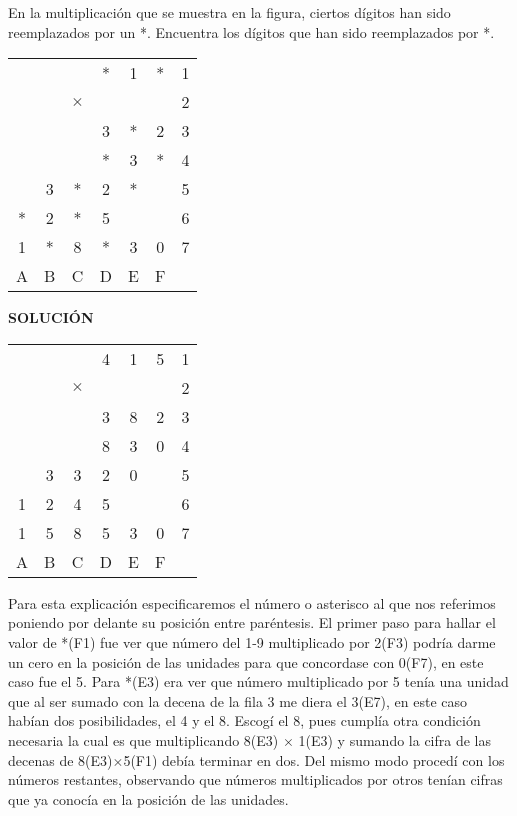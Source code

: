 \begin{excercise}
    En la multiplicación que se muestra en la figura, ciertos dígitos han sido reemplazados por un *.
    Encuentra los dígitos que han sido reemplazados por *.
\end{excercise}

\begin{figure*}
    \centering
    \begin{tabular}{c c c c c c | c}
        &&&*&1&*&  1 \\
        &&$\times$&&&&  2 \\
        &&&3&*&2&  3 \\
        \hline
        &&&*&3&*&  4\\
        &3&*&2&*&&  5 \\
        *&2&*&5&&&  6\\
        \hline
        1&*&8&*&3&0&  7\\
        A&B&C&D&E&F \\
    \end{tabular}    
\end{figure*}


\textbf{SOLUCIÓN}

    \begin{center}    
        \begin{tabular}{c c c c c c | c}
            &&&4&1&5&  1 \\
            &&$\times$&&&&  2 \\
            &&&3&8&2&  3 \\
            \hline
            &&&8&3&0&  4\\
            &3&3&2&0&&  5 \\
            1&2&4&5&&&  6\\
            \hline
            1&5&8&5&3&0&  7\\
            A&B&C&D&E&F \\
        \end{tabular}
    \end{center}

Para esta explicación especificaremos el número o asterisco al que nos referimos poniendo por delante su posición entre paréntesis.
El primer paso para hallar el valor de *(F1) fue ver que número del 1-9 multiplicado por 2(F3) podría darme un cero en la posición de las unidades para que concordase con 0(F7), en este caso fue el 5.
Para *(E3) era ver que número multiplicado por 5 tenía una unidad que al ser sumado con la decena de la fila 3 me diera el 3(E7), en este caso habían dos posibilidades, el 4 y el 8. Escogí el 8, pues cumplía otra condición necesaria la cual es que multiplicando 8(E3) $\times$ 1(E3) y sumando la cifra de las decenas de 8(E3)$\times$5(F1) debía terminar en dos. Del mismo modo procedí con los números restantes, observando que números multiplicados por otros tenían cifras que ya conocía en la posición de las unidades.
\\

